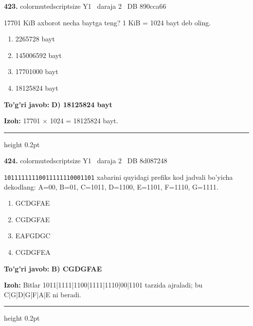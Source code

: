 \documentclass[10pt,a4paper,oneside]{article}
\begin{document}
\noindent\textbf{\color{ink}423.}  {color{muted}scriptsize Y1 \textbullet\ daraja 2 \textbullet\ DB 890cca66}
\par
17701 KiB axborot necha baytga teng? 1 KiB = 1024 bayt deb oling.
\begin{enumerate}[label=\Alph*),leftmargin=9mm]
\item 2265728 bayt
\item 145006592 bayt
\item 17701000 bayt
\item 18125824 bayt
\end{enumerate}
\begin{tcolorbox}[enhanced,breakable,colback=teal!4,colframe=teal!50!black,boxrule=0.5pt,arc=1.1mm,left=3mm,right=3mm,top=1.7mm,bottom=1.7mm,before skip=2mm,after skip=2mm]
\textbf{\color{teal}To'g'ri javob:} \textbf{D) 18125824 bayt}
\par\smallskip
\textbf{Izoh:} 17701 \ensuremath{\times} 1024 = 18125824 bayt.
\end{tcolorbox}
\vspace{2mm}\hrule height 0.2pt \vspace{3mm}

\noindent\textbf{\color{ink}424.}  {color{muted}scriptsize Y1 \textbullet\ daraja 2 \textbullet\ DB 8d087248}
\par
\texttt{10111111110011111110001101} xabarini quyidagi prefiks kod jadvali bo'yicha dekodlang: A=00, B=01, C=1011, D=1100, E=1101, F=1110, G=1111.
\begin{enumerate}[label=\Alph*),leftmargin=9mm]
\item GCDGFAE
\item CGDGFAE
\item EAFGDGC
\item CGDGFEA
\end{enumerate}
\begin{tcolorbox}[enhanced,breakable,colback=teal!4,colframe=teal!50!black,boxrule=0.5pt,arc=1.1mm,left=3mm,right=3mm,top=1.7mm,bottom=1.7mm,before skip=2mm,after skip=2mm]
\textbf{\color{teal}To'g'ri javob:} \textbf{B) CGDGFAE}
\par\smallskip
\textbf{Izoh:} Bitlar 1011|1111|1100|1111|1110|00|1101 tarzida ajraladi; bu C|G|D|G|F|A|E ni beradi.
\end{tcolorbox}
\vspace{2mm}\hrule height 0.2pt \vspace{3mm}
\end{document}
